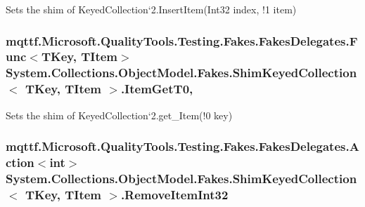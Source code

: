Sets the shim of Keyed\-Collection`2.Insert\-Item(Int32 index, !1 item)

\hypertarget{class_system_1_1_collections_1_1_object_model_1_1_fakes_1_1_shim_keyed_collection_3_01_t_key_00_01_t_item_01_4_a86b00aa849942f8ab1bfb01291b2b18e}{
\subsubsection[{Item\-Get\-T0}]{\setlength{\rightskip}{0pt plus 5cm}mqttf.\-Microsoft.\-Quality\-Tools.\-Testing.\-Fakes.\-Fakes\-Delegates.\-Func$<$T\-Key, T\-Item$>$ System.\-Collections.\-Object\-Model.\-Fakes.\-Shim\-Keyed\-Collection$<$ T\-Key, T\-Item $>$.Item\-Get\-T0\hspace{0.3cm}{\ttfamily [get]}, {\ttfamily [set]}}}\label{class_system_1_1_collections_1_1_object_model_1_1_fakes_1_1_shim_keyed_collection_3_01_t_key_00_01_t_item_01_4_a86b00aa849942f8ab1bfb01291b2b18e}


Sets the shim of Keyed\-Collection`2.get\-\_\-\-Item(!0 key)

\hypertarget{class_system_1_1_collections_1_1_object_model_1_1_fakes_1_1_shim_keyed_collection_3_01_t_key_00_01_t_item_01_4_a4a47c0dc34ef0089e73c3f8644eafb9c}{
\subsubsection[{Remove\-Item\-Int32}]{\setlength{\rightskip}{0pt plus 5cm}mqttf.\-Microsoft.\-Quality\-Tools.\-Testing.\-Fakes.\-Fakes\-Delegates.\-Action$<$int$>$ System.\-Collections.\-Object\-Model.\-Fakes.\-Shim\-Keyed\-Collection$<$ T\-Key, T\-Item $>$.Remove\-Item\-Int32\hspace{0.3cm}{\ttfamily [set]}}}\label{class_system_1_1_collections_1_1_object_model_1_1_fakes_1_1_shim_keyed_collection_3_01_t_key_00_01_t_item_01_4_a4a47c0dc34ef0089e73c3f8644eafb9c}


